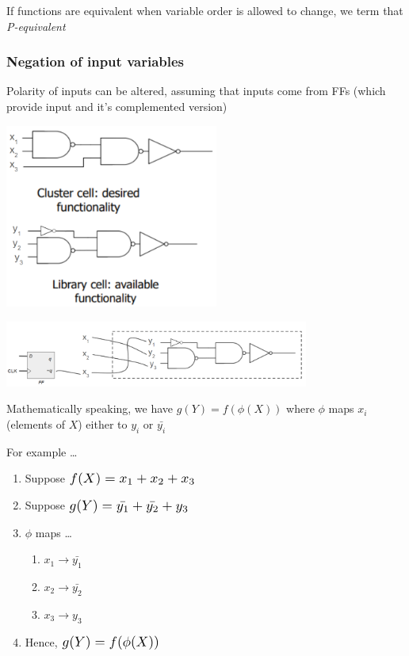 \documentclass{article}
\newcommand*{\Scale}[2][4]{\scalebox{#1}{\ensuremath{#2}}}%
\begin{document}
If functions are equivalent when variable order is allowed to change, we term that \textit{P-equivalent}


\subsubsection{Negation of input variables}
Polarity of inputs can be altered, assuming that inputs come from FFs (which provide input and it's complemented version)

\begin{minipage}[c]{0.5\textwidth}
    \centering
    \includegraphics[width=7cm, scale=1]{S5/inputNegate_cluster_library.PNG}
    \captionsetup{justification=centering}
\end{minipage}%
\begin{minipage}[c]{0.5\textwidth}
    \centering
    \includegraphics[width=10cm, scale=1]{S5/inputNegation.PNG}
    \captionsetup{justification=centering}
\end{minipage}%

Mathematically speaking, we have $g(Y) = f(\phi(X))$ where $\phi$ maps $x_{i}$ (elements of $X$) either to $y_{i}$ or $\bar{y_{i}}$

For example \dots

\begin{enumerate}[label*=\arabic*.]
    \item Suppose $\Scale[1.25]{f(X) = x_{1} + x_{2} + x_{3}}$
    \item Suppose $\Scale[1.25]{g(Y) = \bar{y_{1}} + \bar{y_{2}} + y_{3}}$
    \item $\phi$ maps \dots
        \begin{enumerate}[label*=\arabic*.]
            \item $x_{1} \xrightarrow{} \bar{y_{1}}$
            \item $x_{2} \xrightarrow{} \bar{y_{2}}$
            \item $x_{3} \xrightarrow{} y_{3}$
        \end{enumerate}
    \item Hence, $\Scale[1.25]{g(Y) = f(\phi(X))}$
\end{enumerate}
\end{document}
